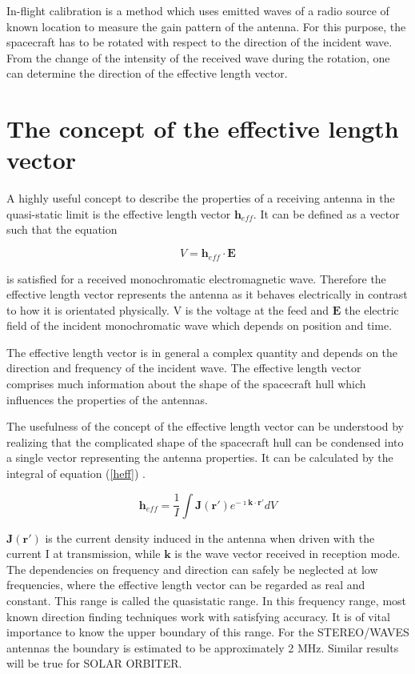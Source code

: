 \documentclass[a4paper,twocolumn]{esapub2005} %
\begin{document}
In-flight calibration is a method which uses emitted waves of a radio source of known location to measure the gain pattern of the antenna. For this purpose, the spacecraft has to be rotated with respect to the direction of the incident wave.  From the change of the intensity of the received wave during the rotation, one can  determine the direction of the effective length vector.

\section{The concept of the effective length vector}
A highly useful concept to describe the properties of a receiving antenna in the quasi-static limit is the effective length vector $\textbf{h}_{eff}$. It can be defined as a vector such that the equation

\begin{equation}\label{antenna_equation}
V=\textbf{h}_{eff}\cdot \textbf{E}
\end{equation}

is satisfied for a received monochromatic electromagnetic wave. Therefore the effective length vector represents the antenna as it behaves electrically in contrast to how it is orientated physically. V is the voltage at the feed and $\mathbf{E}$ the electric field of the incident monochromatic wave which depends on position and time.

The effective length vector is in general a complex quantity and depends on the direction and frequency of the incident wave.  The effective length vector comprises much information about the shape of the spacecraft hull which influences the properties of the antennas.

The usefulness of the concept of the effective length vector can be understood by realizing that the complicated shape of the spacecraft hull can be condensed into a single vector representing the antenna properties. It can be calculated by the integral of equation (\ref{heff}) \cite{macher_dipl,Sinclair,CollinZucker} .

\begin{equation}\label{heff}
\textbf{h}_{eff}=\frac{1}{I}\int \mathbf{J}(\mathbf{r}')e^{-\imath \mathbf{k} \cdot \mathbf{r}'} dV
\end{equation}

$\mathbf{J}(\mathbf{r}')$ is the current density induced in the antenna when driven with the current I at transmission, while $\mathbf{k}$ is the wave vector received in reception mode. The dependencies on frequency and direction can safely be neglected at low frequencies, where the effective length vector can be regarded as real and constant. This range is called the quasistatic range. In this frequency range, most known direction finding techniques work with satisfying accuracy. It is of vital importance to know the upper boundary of this range. For the STEREO/WAVES antennas the boundary is estimated to be approximately 2 MHz. Similar results will be true for SOLAR ORBITER.
\end{document}

